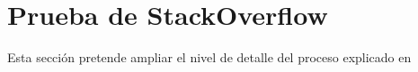 \chapter{Prueba de StackOverflow\label{stackoverflow-test}}

Esta sección pretende ampliar el nivel de detalle del proceso explicado en

